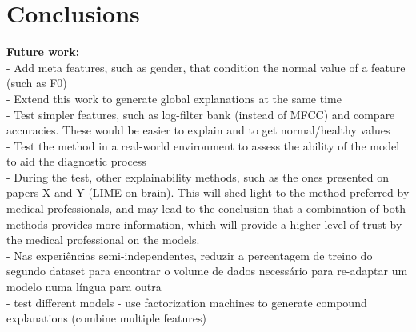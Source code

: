 
\chapter{Conclusions}
\label{ch:magna}



\textbf{Future work: }\\
 - Add meta features, such as gender, that condition the normal value of a feature (such as F0) \\
 - Extend this work to generate global explanations at the same time \\
 - Test simpler features, such as log-filter bank (instead of MFCC) and compare accuracies. These would be easier to explain and to get normal/healthy values \\
 - Test the method in a real-world environment to assess the ability of the model to aid the diagnostic process \\
 - During the test, other explainability methods, such as the ones presented on papers X and Y (LIME on brain). This will shed light to the method preferred by medical professionals, and may lead to the conclusion that a combination of both methods provides more information, which will provide a higher level of trust by the medical professional on the models.\\
 - Nas experiências semi-independentes, reduzir a percentagem de treino do segundo dataset para encontrar o volume de dados necessário para re-adaptar um modelo numa língua para outra \\
 - test different models
 - use factorization machines to generate compound explanations (combine multiple features)

